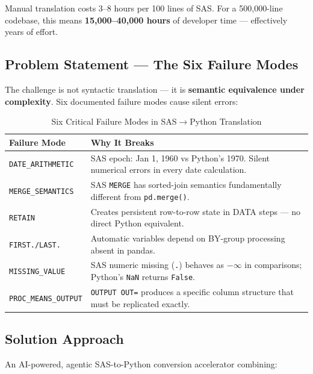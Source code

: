 \documentclass[11pt,a4paper]{article}
\begin{document}
\begin{infobox}
Manual translation costs 3–8 hours per 100 lines of SAS. For a 500,000-line codebase, this means \textbf{15,000–40,000 hours} of developer time — effectively years of effort.
\end{infobox}

\subsection{Problem Statement — The Six Failure Modes}

The challenge is not syntactic translation — it is \textbf{semantic equivalence under complexity}. Six documented failure modes cause silent errors:

\begin{table}[H]
\centering
\caption{Six Critical Failure Modes in SAS$\to$Python Translation}
\renewcommand{\arraystretch}{1.3}
\begin{tabularx}{\textwidth}{@{} l X @{}}
\toprule
\textbf{Failure Mode} & \textbf{Why It Breaks} \\
\midrule
\texttt{DATE\_ARITHMETIC} & SAS epoch: Jan 1, 1960 vs Python's 1970. Silent numerical errors in every date calculation. \\
\texttt{MERGE\_SEMANTICS} & SAS \texttt{MERGE} has sorted-join semantics fundamentally different from \texttt{pd.merge()}. \\
\texttt{RETAIN} & Creates persistent row-to-row state in DATA steps — no direct Python equivalent. \\
\texttt{FIRST./LAST.} & Automatic variables depend on BY-group processing absent in pandas. \\
\texttt{MISSING\_VALUE} & SAS numeric missing (\texttt{.}) behaves as $-\infty$ in comparisons; Python's \texttt{NaN} returns \texttt{False}. \\
\texttt{PROC\_MEANS\_OUTPUT} & \texttt{OUTPUT OUT=} produces a specific column structure that must be replicated exactly. \\
\bottomrule
\end{tabularx}
\end{table}

\subsection{Solution Approach}

An AI-powered, agentic SAS-to-Python conversion accelerator combining:
\end{document}

